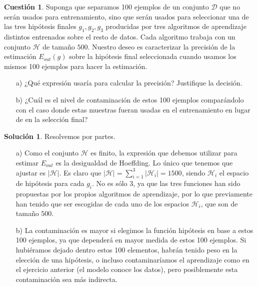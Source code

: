 \documentclass[a4paper, 11pt]{article}
\theoremstyle{definition}
\newtheorem{cuestion}{Cuestión}
\newtheorem*{solucion}{Solución}
\begin{document}
  \begin{cuestion}
    Suponga que separamos 100 ejemplos de un conjunto $\mathcal{D}$ que no serán usados para entrenamiento, sino que serán usados para seleccionar una de las tres hipótesis finales $g_1,g_2,g_3$ producidas por tres algoritmos de aprendizaje distintos entrenados sobre el resto de datos. Cada algoritmo trabaja con un conjunto $\mathcal{H}$ de tamaño $500$. Nuestro deseo es caracterizar la precisión de la estimación $E_{out}(g)$ sobre la hipótesis final seleccionada cuando usamos los mismos 100 ejemplos para hacer la estimación.

    \begin{enumerate}
      \item[a)] ¿Qué expresión usaría para calcular la precisión? Justifique la decisión.
      \item[b)] ¿Cuál es el nivel de contaminación de estos 100 ejemplos comparándolo con el caso donde estas muestras fueran usadas en el entrenamiento en lugar de en la selección final?
    \end{enumerate}
  \end{cuestion}

  \begin{solucion}
    Resolvemos por partes.
    \begin{enumerate}
      \item[a)] Como el conjunto $\mathcal{H}$ es finito, la expresión que debemos utilizar para estimar $E_{out}$ es la desigualdad de Hoeffding. Lo único que tenemos que ajustar es $|\mathcal{H}|$. Es claro que $|\mathcal{H}| = \sum_{i=1}^3 |\mathcal{H}_i| = 1500$, siendo $\mathcal{H}_i$ el espacio de hipótesis para cada $g_i$. No es sólo $3$, ya que las tres funciones han sido propuestas por los propios algoritmos de aprendizaje, por lo que previamente han tenido que ser escogidas de cada uno de los espacios $\mathcal{H}_i$, que son de tamaño $500$.
      \item[b)] La contaminación es mayor si elegimos la función hipótesis en base a estos 100 ejemplos, ya que dependerá en mayor medida de estos 100 ejemplos. Si hubiéramos dejado dentro estos 100 elementos, habrán tenido peso en la elección de una hipótesis, o incluso contaminaríamos el aprendizaje como en el ejercicio anterior (el modelo conoce los datos), pero posiblemente esta contaminación sea más indirecta.
    \end{enumerate}


  \end{solucion}
\end{document}
